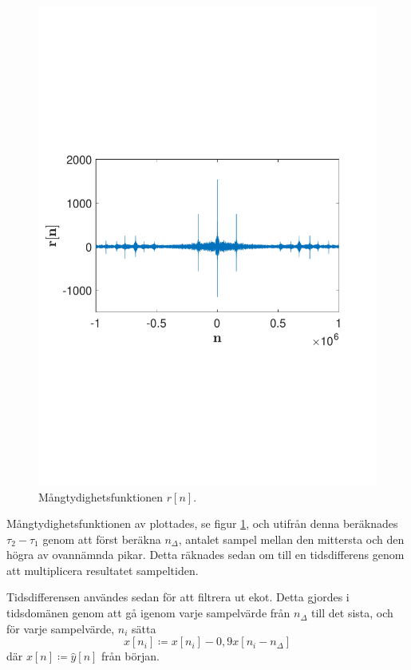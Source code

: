 \documentclass[10pt,twocolumn,a4paper]{article}
\begin{document}
\begin{figure}
    \includegraphics[trim = 0 80mm 0 90mm, clip, width=\linewidth]{fig1.pdf}
    \caption{ Mångtydighetsfunktionen $r[n]$. \label{fig:z} }
\end{figure}

Mångtydighetsfunktionen av \yhat  plottades, se figur \ref{fig:z}, och
utifrån denna beräknades $\tau_2 - \tau_1$ genom att först beräkna
$n_\Delta$, antalet sampel mellan den mittersta och den högra av ovannämnda
pikar. Detta räknades sedan om till en tidsdifferens genom att multiplicera
resultatet sampeltiden.

Tidsdifferensen användes sedan för att filtrera ut ekot. Detta gjordes i
tidsdomänen genom att gå igenom varje sampelvärde från $n_\Delta$ till det
sista, och för varje sampelvärde, $n_i$ sätta 
\begin{equation}
x[n_i] \coloneqq x[n_i] - 0,9x[n_i - n_\Delta] 
\label{e4}
\end{equation}
där $x[n] \coloneqq \hat{y}[n]$ från början.
\end{document}
